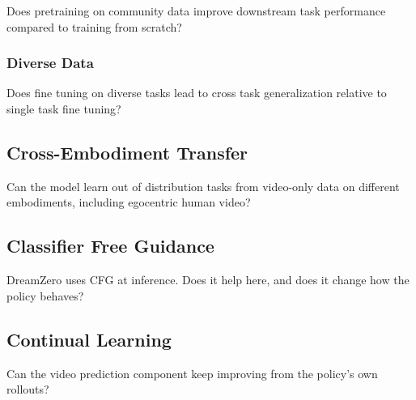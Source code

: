 Does pretraining on community data improve downstream task performance compared to training from scratch?

\subsubsection{Diverse Data}

Does fine tuning on diverse tasks lead to cross task generalization relative to single task fine tuning?

\subsection{Cross-Embodiment Transfer}

Can the model learn out of distribution tasks from video-only data on different embodiments, including egocentric human video?

\subsection{Classifier Free Guidance}

DreamZero uses CFG at inference. Does it help here, and does it change how the policy behaves?

\subsection{Continual Learning}

Can the video prediction component keep improving from the policy's own rollouts?
